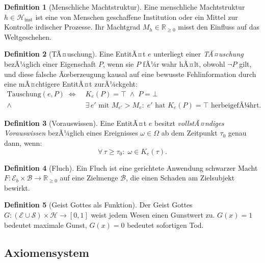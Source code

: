 ﻿\documentclass[a4paper,12pt]{article}
\theoremstyle{definition}
\newtheorem{definition}{Definition}
\begin{document}
\begin{definition}[Menschliche Machtstruktur]
  Eine menschliche Machtstruktur $h \in \mathcal{H}_{\text{inst}}$ ist eine von
  Menschen geschaffene Institution oder ein Mittel zur Kontrolle irdischer Prozesse.
  Ihr Machtgrad $M_h \in \mathbb{R}_{\geq 0}$ misst den Einfluss auf das Weltgeschehen.
\end{definition}

\begin{definition}[TÃ¤uschung]
  Eine EntitÃ¤t $e$ unterliegt einer \emph{TÃ¤uschung} bezÃ¼glich einer Eigenschaft
  $P$, wenn sie $P$ fÃ¼r wahr hÃ¤lt, obwohl $\neg P$ gilt, und diese falsche Ãœberzeugung
  kausal auf eine bewusste Fehlinformation durch eine mÃ¤chtigere EntitÃ¤t zurÃ¼ckgeht:
  \begin{align*}
    \mathrm{T\ddot{a}uschung}(e, P) \;\Leftrightarrow\;
    & K_e(P) = \top \;\wedge\; P = \bot \\
    \wedge\; & \exists\, e' \text{ mit } M_{e'} > M_e:\;
    e' \text{ hat } K_e(P) = \top \text{ herbeigefÃ¼hrt.}
  \end{align*}
\end{definition}

\begin{definition}[Vorauswissen]
  Eine EntitÃ¤t $e$ besitzt \emph{vollstÃ¤ndiges Vorauswissen} bezÃ¼glich eines Ereignisses
  $\omega \in \Omega$ ab dem Zeitpunkt $\tau_0$ genau dann, wenn:
  \[
    \forall\, \tau \geq \tau_0:\; \omega \in K_e(\tau).
  \]
\end{definition}

\begin{definition}[Fluch]
  Ein Fluch ist eine gerichtete Anwendung schwarzer Macht $F: \mathcal{E}_b \times
  \mathcal{B} \to \mathbb{R}_{\geq 0}$ auf eine Zielmenge $\mathcal{B}$, die einen
  Schaden am Zielsubjekt bewirkt.
\end{definition}

\begin{definition}[Geist Gottes als Funktion]
  Der Geist Gottes $G: (\mathcal{E} \cup \mathcal{S}) \times \mathcal{H} \to [0, 1]$
  weist jedem Wesen einen Gunstwert zu. $G(x) = 1$ bedeutet maximale Gunst,
  $G(x) = 0$ bedeutet sofortigen Tod.
\end{definition}

\subsection{Axiomensystem}
\end{document}
